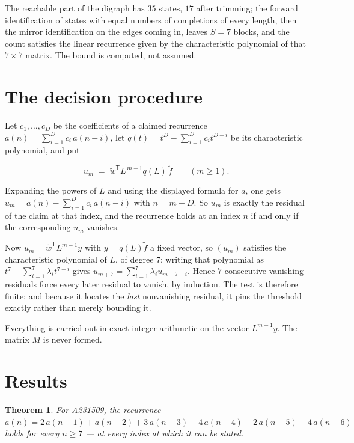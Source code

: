 \documentclass[11pt]{article}
\newtheorem{theorem}{Theorem}
\theoremstyle{definition}
\begin{document}
The reachable part of the digraph has $35$ states, $17$ after trimming; the forward identification of states with equal numbers of completions of every length, then the mirror identification on the edges coming in, leaves $S = 7$ blocks, and the count satisfies the linear recurrence given by the characteristic polynomial of that $7\times7$ matrix. The bound is computed, not assumed.

\section{The decision procedure}

Let $c_1,\dots,c_D$ be the coefficients of a claimed recurrence $a(n) = \sum_{i=1}^{D} c_i\,a(n-i)$, let $q(t) = t^{D} - \sum_{i=1}^{D} c_i t^{D-i}$ be its characteristic polynomial, and put

\[u_m \;=\; \tilde w^{\mathsf T} L^{\,m-1} q(L)\,\tilde f \qquad (m \ge 1).\]

Expanding the powers of $L$ and using the displayed formula for $a$, one gets $u_m = a(n) - \sum_{i=1}^{D} c_i\,a(n-i)$ with $n = m + D$. So $u_m$ is exactly the residual of the claim at that index, and the recurrence holds at an index $n$ if and only if the corresponding $u_m$ vanishes.

Now $u_m = \tilde w^{\mathsf T} L^{m-1} y$ with $y = q(L)\tilde f$ a fixed vector, so $(u_m)$ satisfies the characteristic polynomial of $L$, of degree $7$: writing that polynomial as $t^{7} - \sum_{i=1}^{7} \lambda_i t^{7-i}$ gives $u_{m+7} = \sum_{i=1}^{7} \lambda_i u_{m+7-i}$. Hence $7$ consecutive vanishing residuals force every later residual to vanish, by induction. The test is therefore finite; and because it locates the {\itshape last} nonvanishing residual, it pins the threshold exactly rather than merely bounding it.

Everything is carried out in exact integer arithmetic on the vector $L^{m-1}y$. The matrix $M$ is never formed.

\section{Results}

\begin{theorem} For A231509, the recurrence $a(n) = 2\,a(n-1) + a(n-2) + 3\,a(n-3) - 4\,a(n-4) - 2\,a(n-5) - 4\,a(n-6)$ holds for every $n \ge 7$ --- at every index at which it can be stated.\end{theorem}
\end{document}
